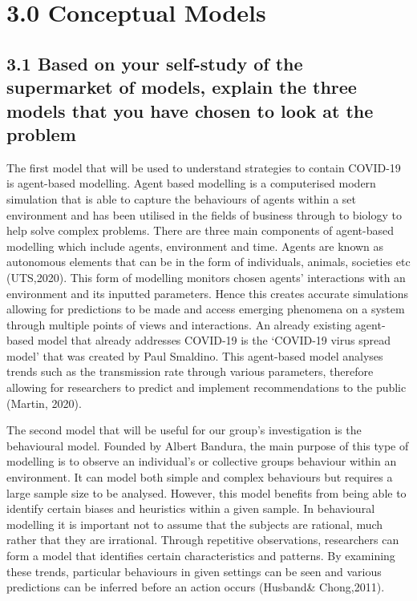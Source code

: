 \documentclass[11pt]{article}
\begin{document}
    \hypertarget{conceptual-models}{%
\section{3.0 Conceptual Models}\label{conceptual-models}}

    \hypertarget{based-on-your-self-study-of-the-supermarket-of-models-explain-the-three-models-that-you-have-chosen-to-look-at-the-problem}{%
\subsection{3.1 Based on your self-study of the supermarket of models,
explain the three models that you have chosen to look at the
problem}\label{based-on-your-self-study-of-the-supermarket-of-models-explain-the-three-models-that-you-have-chosen-to-look-at-the-problem}}

    The first model that will be used to understand strategies to contain
COVID-19 is agent-based modelling. Agent based modelling is a
computerised modern simulation that is able to capture the behaviours of
agents within a set environment and has been utilised in the fields of
business through to biology to help solve complex problems. There are
three main components of agent-based modelling which include agents,
environment and time. Agents are known as autonomous elements that can
be in the form of individuals, animals, societies etc (UTS,2020). This
form of modelling monitors chosen agents' interactions with an
environment and its inputted parameters. Hence this creates accurate
simulations allowing for predictions to be made and access emerging
phenomena on a system through multiple points of views and interactions.
An already existing agent-based model that already addresses COVID-19 is
the `COVID-19 virus spread model' that was created by Paul Smaldino.
This agent-based model analyses trends such as the transmission rate
through various parameters, therefore allowing for researchers to
predict and implement recommendations to the public (Martin, 2020).

    The second model that will be useful for our group's investigation is
the behavioural model. Founded by Albert Bandura, the main purpose of
this type of modelling is to observe an individual's or collective
groups behaviour within an environment. It can model both simple and
complex behaviours but requires a large sample size to be analysed.
However, this model benefits from being able to identify certain biases
and heuristics within a given sample. In behavioural modelling it is
important not to assume that the subjects are rational, much rather that
they are irrational. Through repetitive observations, researchers can
form a model that identifies certain characteristics and patterns. By
examining these trends, particular behaviours in given settings can be
seen and various predictions can be inferred before an action occurs
(Husband\& Chong,2011).
\end{document}
